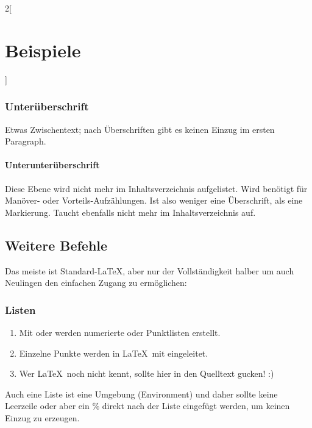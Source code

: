 \documentclass[linksbund,ATvorVT]{rpg-ilaris}
\begin{document}
\begin{multicols}{2}[        %
		\chapter*{Beispiele}  %
		]
	\subsection{Unterüberschrift}
	Etwas Zwischentext; nach Überschriften gibt es keinen Einzug im ersten Paragraph.
	\subsubsection{Unterunterüberschrift}
	Diese Ebene wird nicht mehr im Inhaltsverzeichnis aufgelistet.
	Wird benötigt für Manöver- oder Vorteils-Aufzählungen. Ist also weniger eine Überschrift, als eine Markierung. Taucht ebenfalls nicht mehr im Inhaltsverzeichnis auf.

\section{Weitere Befehle}
Das meiste ist Standard-\LaTeX, aber nur der Vollständigkeit halber um auch Neulingen den einfachen Zugang zu ermöglichen:
\subsection{Listen}
\begin{enumerate}
	\item Mit  oder  werden numerierte oder Punktlisten erstellt.
	\item Einzelne Punkte werden in \LaTeX\ mit  eingeleitet.
	\item Wer \LaTeX\ noch nicht kennt, sollte hier in den Quelltext gucken! :)
\end{enumerate}

Auch eine Liste ist eine Umgebung (Environment) und daher sollte keine Leerzeile oder aber ein \% direkt nach der Liste eingefügt werden, um keinen Einzug zu erzeugen.




\end{multicols}
\end{document}
